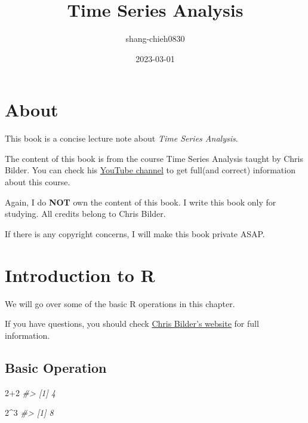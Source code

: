 \documentclass[
]{book}
\title{Time Series Analysis}
\author{shang-chieh0830}
\date{2023-03-01}
\newenvironment{Shaded}{\begin{snugshade}}{\end{snugshade}}
\newcommand{\CommentTok}[1]{\textcolor[rgb]{0.56,0.35,0.01}{\textit{#1}}}
\newcommand{\DecValTok}[1]{\textcolor[rgb]{0.00,0.00,0.81}{#1}}
\newcommand{\SpecialCharTok}[1]{\textcolor[rgb]{0.00,0.00,0.00}{#1}}
\begin{document}
\maketitle

{
\setcounter{tocdepth}{1}
\tableofcontents
}
\hypertarget{about}{%
\chapter{About}\label{about}}

This book is a concise lecture note about \emph{Time Series Analysis}.

The content of this book is from the course Time Series Analysis taught by Chris Bilder. You can check his \href{https://www.youtube.com/@ChrisBilder}{YouTube channel} to get full(and correct) information about this course.

Again, I do \textbf{NOT} own the content of this book. I write this book only for studying. All credits belong to Chris Bilder.

If there is any copyright concerns, I will make this book private ASAP.

\hypertarget{introduction-to-r}{%
\chapter{Introduction to R}\label{introduction-to-r}}

We will go over some of the basic R operations in this chapter.

If you have questions, you should check \href{http://www.chrisbilder.com/stat878/sections.html}{Chris Bilder's website} for full information.

\hypertarget{basic-operation}{%
\section{Basic Operation}\label{basic-operation}}

\begin{Shaded}
\begin{Highlighting}[]
\DecValTok{2}\SpecialCharTok{+}\DecValTok{2}
\CommentTok{\#\textgreater{} [1] 4}
\end{Highlighting}
\end{Shaded}

\begin{Shaded}
\begin{Highlighting}[]
\DecValTok{2}\SpecialCharTok{\^{}}\DecValTok{3}
\CommentTok{\#\textgreater{} [1] 8}
\end{Highlighting}
\end{Shaded}
\end{document}
